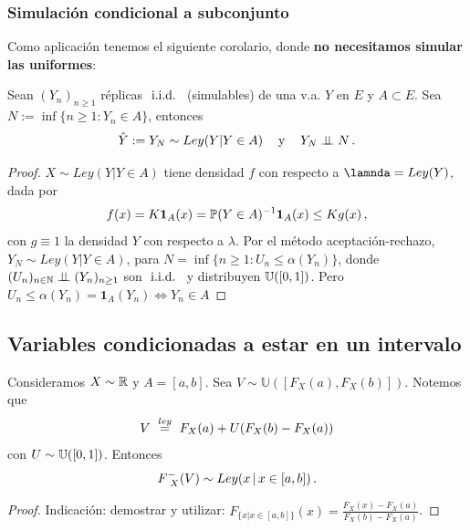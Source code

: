 \subsubsection{Simulación condicional a subconjunto}
Como aplicación tenemos el siguiente corolario, donde \textbf{no necesitamos simular las uniformes}:
\begin{corolary}
\label{corclase7}
\newline Sean $(Y_n)_{n\geq 1}$ réplicas $\iid$ (simulables) de una v.a. $Y$ en $E$ y $A\subset E$. Sea $N:=\inf\{n\geq 1: Y_n\in A\}$, entonces
$$ \hat{Y}:=Y_N\sim Ley(Y|Y\in A) \espacio \mbox{ y }\espacio Y_N\indep N \, .$$
\end{corolary}
\begin{proof}
\gris
$X\sim Ley(Y|Y\in A)$ tiene densidad $f$ con respecto a $\lamnda=Ley(Y)$, dada por
$$ f(x) = K\mathbf{1}_A(x) = \P(Y\in A)^{-1}\mathbf{1}_A(x)\leq K g(x) \, ,$$
con $g\equiv 1$ la densidad $Y$ con respecto a $\lambda$.  Por el método aceptación-rechazo, $Y_N\sim Ley(Y|Y\in A)$, para $N=\inf\{n\geq1:U_n\leq\alpha(Y_n)\}$, donde $(U_n)_{n\in\N}\indep (Y_n)_{n\geq1}$ son $\iid$ y distribuyen $\unif$. Pero $U_n\leq\alpha(Y_n)=\mathbf{1}_A(Y_n)\Longleftrightarrow Y_n\in A$
\findem
\negro
\end{proof}

\subsection{Variables condicionadas a estar en un intervalo}
\begin{proposition}
Consideramos $X\sim \R$ y $A=[a,b]$. Sea $V\sim\mathbb{U}([F_X(a),F_X(b)])$.
Notemos que 
$$V\igualley F_X(a)+U(F_X(b)-F_X(a))$$
con $U\sim \unif$. Entonces
$$ \Finvgen (V) \sim Ley(x \, |\, x\in[a,b]) \, .$$
\end{proposition}
\begin{proof}
\ejercicio
\newline \gris Indicación: demostrar y utilizar: $F_{\{x|x\in[a,b]\}}(x)=\displaystyle\frac{F_X(x)-F_X(a)}{F_X(b)-F_X(a)}$. \negro
\end{proof}
\vspace{1cm}
